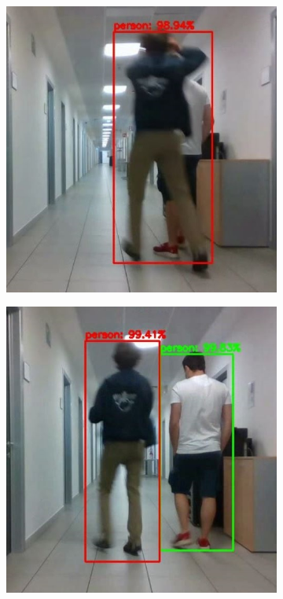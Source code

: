 \begin{figure}[!h]
	\centering
	\begin{subfigure}[!h]{0.325\textwidth}
		\includegraphics[width=\linewidth]{images/solution/sequenceTrackOk1}
	\end{subfigure}
	\begin{subfigure}[!h]{0.325\textwidth}
		\includegraphics[width=\linewidth]{images/solution/sequenceTrackOk2}

\end{subfigure}
\end{figure}

